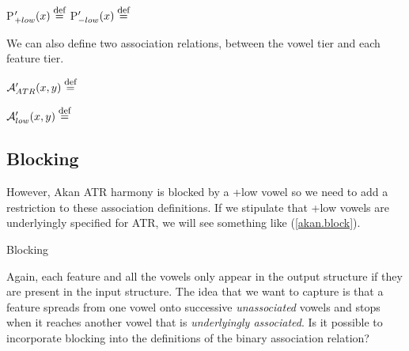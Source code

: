 \documentclass[,doc,floatsintext]{apa6}
\def\defeq{\mathrel{\buildrel \mbox{\footnotesize def} \over =}}
\theoremstyle{definition}
\theoremstyle{definition}
\theoremstyle{definition}
\theoremstyle{remark}
\begin{document}
P\('_{+low}(x) \defeq\) \hspace{2.25in}
P\('_{-low}(x) \defeq\)\vspace{0.5in}

\noindent We can also define two association relations, between the
vowel tier and each feature tier.

\(\mathcal{A}_{ATR}'(x, y) \defeq\)\vspace{0.5in}

\(\mathcal{A}_{low}'(x, y) \defeq\)\vspace{0.5in}

\subsection{Blocking}\label{blocking}

However, Akan ATR harmony is blocked by a +low vowel so we need to add a
restriction to these association definitions. If we stipulate that +low
vowels are underlyingly specified for ATR, we will see something like
(\ref{akan.block}).

\begin{exe}
  \ex \label{akan.block} Blocking\\
\end{exe}

\newpage

\noindent Again, each feature and all the vowels only appear in the
output structure if they are present in the input structure. The idea
that we want to capture is that a feature spreads from one vowel onto
successive \emph{unassociated} vowels and stops when it reaches another
vowel that is \emph{underlyingly associated}. Is it possible to
incorporate blocking into the definitions of the binary association
relation?
\end{document}
